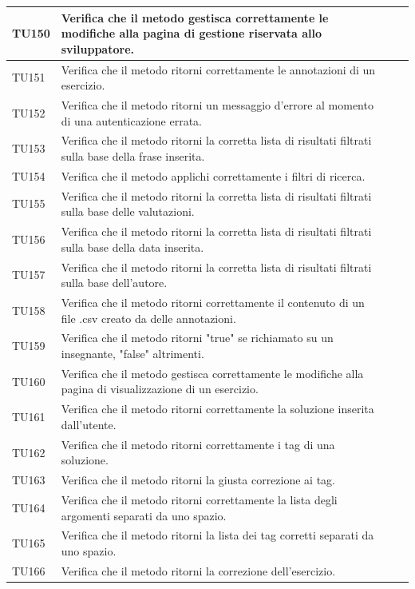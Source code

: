\begin{longtable}{|>{\centering\arraybackslash}m{1.6cm}|>{\centering\arraybackslash}m{6.41cm}|>{\centering\arraybackslash}m{3.1cm}| c |}
		TU150 & Verifica che il metodo gestisca correttamente le modifiche alla pagina di gestione riservata allo sviluppatore. \\ \hline
		\rowcolor{LightGray}
		TU151 & Verifica che il metodo ritorni correttamente le annotazioni di un esercizio.\\ \hline
		TU152 & Verifica che il metodo ritorni un messaggio d'errore al momento di una autenticazione errata.\\ \hline
		\rowcolor{LightGray}
		TU153 & Verifica che il metodo ritorni la corretta lista di risultati filtrati sulla base della frase inserita. \\ \hline
		TU154 & Verifica che il metodo applichi correttamente i filtri di ricerca. \\ \hline
		\rowcolor{LightGray}
		TU155 & Verifica che il metodo ritorni la corretta lista di risultati filtrati sulla base delle valutazioni.\\ \hline
		\rowcolor{LightGray}
		TU156 & Verifica che il metodo ritorni la corretta lista di risultati filtrati sulla base della data inserita.\\ \hline
		TU157 & Verifica che il metodo ritorni la corretta lista di risultati filtrati sulla base dell'autore.\\ \hline
		\rowcolor{LightGray}
		TU158 & Verifica che il metodo ritorni correttamente il contenuto di un file .csv creato da delle annotazioni.\\ \hline
		TU159 & Verifica che il metodo ritorni "true" se richiamato su un insegnante, "false" altrimenti. \\ \hline
		\rowcolor{LightGray}
		TU160 & Verifica che il metodo gestisca correttamente le modifiche alla pagina di visualizzazione di un esercizio. \\ \hline
		TU161 & Verifica che il metodo ritorni correttamente la soluzione inserita dall'utente. \\ \hline
		\rowcolor{LightGray}
		TU162 & Verifica che il metodo ritorni correttamente i tag di una soluzione. \\ \hline
		TU163 & Verifica che il metodo ritorni la giusta correzione ai tag. \\ \hline
		\rowcolor{LightGray}
		TU164 & Verifica che il metodo ritorni correttamente la lista degli argomenti separati da uno spazio. \\ \hline
		TU165 & Verifica che il metodo ritorni la lista dei tag corretti separati da uno spazio. \\ \hline
		\rowcolor{LightGray}
		TU166 & Verifica che il metodo ritorni la correzione dell'esercizio. \\ \hline

\end{longtable}
